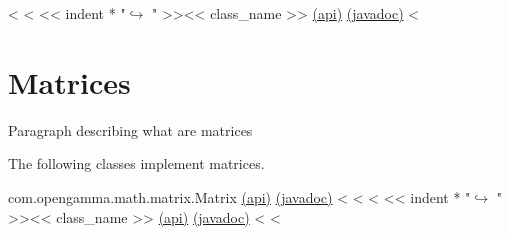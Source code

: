 \begin{fullwidth}
<%
<%
<< indent * "$\hookrightarrow$ " >><< class_name >> \href{http://docs-static.hq.opengamma.com/0.7.0/analytics/api/<< package_name >>.html#class-<<class_name>>}{(api)} \href{http://docs-static.hq.opengamma.com/0.7.0/analytics/javadoc/<< class_name.replace(".","/") >>.html}{(javadoc)}
<%
\end{fullwidth}

\section{Matrices}

Paragraph describing what are matrices

The following classes implement matrices.

\begin{fullwidth}

com.opengamma.math.matrix.Matrix \href{http://docs-static.hq.opengamma.com/0.7.0/analytics/api/com.opengamma.math.matrix.Matrix.html#class-com.opengamma.math.matrix.Matrix}{(api)} \href{http://docs-static.hq.opengamma.com/0.7.0/analytics/javadoc/com/opengamma/math/matrix/Matrix}{(javadoc)}
<%
<%
<%
<< indent * "$\hookrightarrow$ " >><< class_name >> \href{http://docs-static.hq.opengamma.com/0.7.0/analytics/api/<< package_name >>.html#class-<<class_name>>}{(api)} \href{http://docs-static.hq.opengamma.com/0.7.0/analytics/javadoc/<< class_name.replace(".","/") >>.html}{(javadoc)}
<%
<%

\end{fullwidth}

